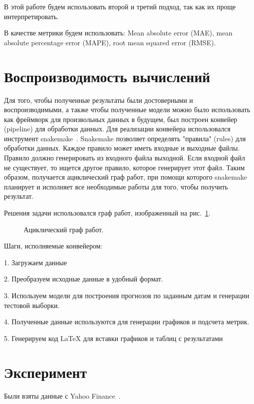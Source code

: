 \documentclass[a4paper,article,14pt]{extarticle}
\begin{document}
В этой работе будем использовать второй и третий подход, так как их проще интерпретировать.

В качестве метрики будем использовать: Mean absolute error (MAE), mean absolute percentage error (MAPE), root mean squared error (RMSE).

\section{Воспроизводимость вычислений}

Для того, чтобы полученные результаты были достоверными и воспроизводимыми, а также чтобы полученные модели можно было использовать как фреймворк для произвольных данных в будущем, был построен конвейер (pipeline) для обработки данных.
Для реализации конвейера использовался инструмент snakemake~\cite{snakemake}.
Snakemake позволяет определять "правила" (rules) для обработки данных.
Каждое правило может иметь входные и выходные файлы.
Правило должно генерировать из входного файла выходной.
Если входной файл не существует, то ищется другое правило, которое генерирует этот файл.
Таким образом, получается ациклический граф работ, при помощи которого snakemake планирует и исполняет все необходимые работы для того, чтобы получить результат.

Решения задачи использовался граф работ, изображенный на рис.~\ref{graph_dag}.
\begin{figure}[ht]
\begin{center}
\caption{
\label{graph_dag}
     Ациклический граф работ.}
\end {center}
\end {figure}
Шаги, исполняемые конвейером:

1.
Загружаем данные

2.
Преобразуем исходные данные в удобный формат.

3.
Используем модели для построения прогнозов по заданным датам и генерации тестовой выборки.

4.
Полученные данные используются для генерации графиков и подсчета метрик.

5.
Генерируем код LaTeX для вставки графиков и таблиц с результатами

\section{Эксперимент}

Были взяты данные с Yahoo Finance~\cite{yahoo}.
\end{document}
